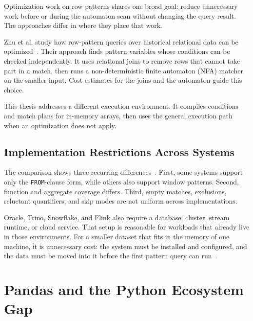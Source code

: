 Optimization work on row patterns shares one broad goal: reduce
unnecessary work before or during the automaton scan without changing
the query result.  The approaches differ in where they place that
work.

Zhu et al. study how row-pattern queries over historical relational
data can be optimized~\cite{Zhu2023rowpattern}.  Their approach finds
pattern variables whose conditions can be checked independently.  It
uses relational joins to remove rows that cannot take part in a match,
then runs a non-deterministic finite automaton (NFA) matcher on the
smaller input.  Cost estimates for the joins and the automaton guide
this choice.

This thesis addresses a different execution environment.  It compiles
conditions and match plans for in-memory arrays, then uses the general
execution path when an optimization does not apply.

\subsection{Implementation Restrictions Across Systems}
\label{subsec:related-restrictions}

The comparison shows three recurring differences~\cite{
oracle2021dwhsg,trino2022,flink,snowflake2025match_recognize,
petkovic2022rpr}.  First, some systems support only the
\texttt{FROM}-clause form, while others also support window patterns.
Second, function and aggregate coverage differs.  Third, empty
matches, exclusions, reluctant quantifiers, and skip modes are not
uniform across implementations.

Oracle, Trino, Snowflake, and Flink also require a database, cluster,
stream runtime, or cloud service.  That setup is reasonable for
workloads that already live in those environments.  For a smaller
dataset that fits in the memory of one machine, it is unnecessary
cost: the system must be installed and configured, and the data must
be moved into it before the first pattern query can
run~\cite{8509400,Evaluation,in-memory_processing}.

\section{Pandas and the Python Ecosystem Gap}
\label{sec:related-pandas-gap}

